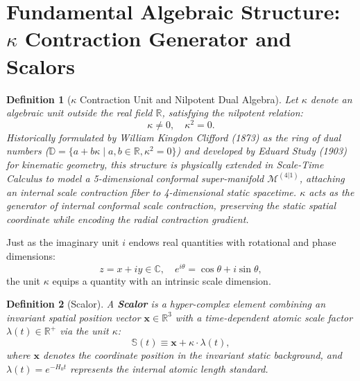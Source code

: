 \documentclass[11pt,a4paper]{article}
\newtheorem{definition}{Definition}[section]
\begin{document}
\section{Fundamental Algebraic Structure: $\kappa$ Contraction Generator and Scalors}
\label{sec:cebir}

\begin{definition}[$\kappa$ Contraction Unit and Nilpotent Dual Algebra]
    \label{def:kappa_nilpotent_sc}
    Let $\kappa$ denote an algebraic unit outside the real field $\mathbb{R}$, satisfying the nilpotent relation:
    \begin{equation}
        \kappa \neq 0, \quad \kappa^2 = 0.
        \label{eq:kappa_tanim}
    \end{equation}
    Historically formulated by William Kingdon Clifford (1873) as the ring of dual numbers ($\mathbb{D} = \{a + b\kappa \mid a, b \in \mathbb{R}, \kappa^2 = 0\}$) and developed by Eduard Study (1903) for kinematic geometry, this structure is physically extended in Scale-Time Calculus to model a 5-dimensional conformal super-manifold $\mathcal{M}^{(4|1)}$, attaching an internal scale contraction fiber to 4-dimensional static spacetime. $\kappa$ acts as the generator of internal conformal scale contraction, preserving the static spatial coordinate while encoding the radial contraction gradient.
\end{definition}

Just as the imaginary unit $i$ endows real quantities with rotational and phase dimensions:
$$z = x + i y \in \mathbb{C}, \quad e^{i\theta} = \cos\theta + i \sin\theta,$$
the unit $\kappa$ equips a quantity with an intrinsic scale dimension.

\begin{definition}[Scalor]
    \label{def:skalor_sc}
    A \textbf{Scalor} is a hyper-complex element combining an invariant spatial position vector $\mathbf{x} \in \mathbb{R}^3$ with a time-dependent atomic scale factor $\lambda(t) \in \mathbb{R}^+$ via the unit $\kappa$:
    \begin{equation}
        \mathbb{S}(t) \equiv \mathbf{x} + \kappa \cdot \lambda(t),
        \label{eq:skalor_tanim}
    \end{equation}
    where $\mathbf{x}$ denotes the coordinate position in the invariant static background, and $\lambda(t) = e^{-H_0 t}$ represents the internal atomic length standard.
\end{definition}
\end{document}
